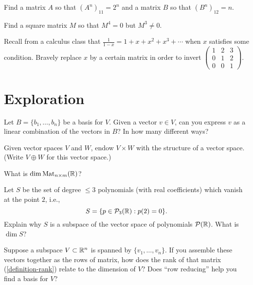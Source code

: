 \documentclass{homework}
\begin{document}
\begin{problem}
  Find a matrix $A$ so that $(A^n)_{11} = 2^n$ and a matrix $B$ so that $(B^n)_{12} = n$.
\end{problem}

\begin{problem}
  Find a square matrix $M$ so that $M^4 = 0$ but $M^3 \neq 0$.
\end{problem}

\begin{problem}\label{inverse-via-calculus}Recall from a calculus class that
  $\frac{1}{1-x} = 1 + x + x^2 + x^3 + \cdots$ when $x$ satisfies some
  condition.  Bravely replace $x$ by a certain matrix in order to
  invert
  $\begin{pmatrix} 1 & 2 & 3 \\ 0 & 1 & 2 \\ 0 & 0 & 1 \end{pmatrix}$.
\end{problem}

\section{Exploration}

\begin{problem}
  Let $B = \{ b_1, \ldots, b_n \}$ be a basis for $V$.  Given a vector
  $v \in V$, can you express $v$ as a linear
  combination of the vectors in $B$?  In how many different ways?
\end{problem}

\begin{problem}\label{direct-sum-of-spaces}Given vector spaces $V$ and $W$, endow $V \times W$ with the
  structure of a vector space.  (Write $V \oplus W$ for this
  vector space.)
\end{problem}

\begin{problem}
  What is $\dim \operatorname{Mat}_{n \times m}(\mathbb{R})$?
\end{problem}

\begin{problem}
  Let $S$ be the set of degree $\leq 3$ polynomials (with real
  coefficients) which vanish at the point $2$, i.e.,
  \[ S = \{ p \in \mathcal{P}_{3}(\mathbb{R}) : p(2) = 0 \}. \] Explain
  why $S$ is a subspace of the vector space of polynomials
  $\mathcal{P}(\mathbb{R})$.  What is $\dim S$?
\end{problem}

\begin{problem}
  Suppose a subspace $V \subset \mathbb{R}^n$ is spanned by
  $\{v_1,\ldots,v_n\}$.  If you assemble these vectors together as the
  rows of matrix, how does the rank of that matrix
  (\ref{definition-rank}) relate to the dimension of $V$?  Does ``row
  reducing'' help you find a basis for $V$?
\end{problem}
\end{document}
